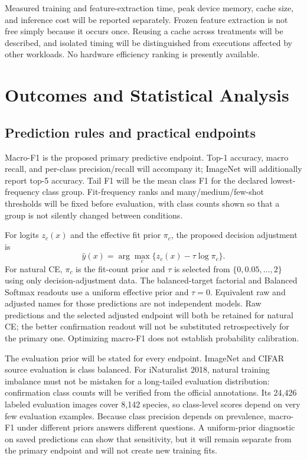 \documentclass[conference]{IEEEtran}
\begin{document}
Measured training and feature-extraction time, peak device memory, cache size, and inference cost will be reported separately. Frozen feature extraction is not free simply because it occurs once. Reusing a cache across treatments will be described, and isolated timing will be distinguished from executions affected by other workloads. No hardware efficiency ranking is presently available.

\section{Outcomes and Statistical Analysis}
\subsection{Prediction rules and practical endpoints}
Macro-F1 is the proposed primary predictive endpoint. Top-1 accuracy, macro recall, and per-class precision/recall will accompany it; ImageNet will additionally report top-5 accuracy. Tail F1 will be the mean class F1 for the declared lowest-frequency class group. Fit-frequency ranks and many/medium/few-shot thresholds will be fixed before evaluation, with class counts shown so that a group is not silently changed between conditions.

For logits $z_c(x)$ and the effective fit prior $\pi_c$, the proposed decision adjustment is
\begin{equation}
\hat y(x)=\arg\max_c\{z_c(x)-\tau\log\pi_c\}.
\label{eq:adjustment}
\end{equation}
For natural CE, $\pi_c$ is the fit-count prior and $\tau$ is selected from $\{0,0.05,\ldots,2\}$ using only decision-adjustment data. The balanced-target factorial and Balanced Softmax readouts use a uniform effective prior and $\tau=0$. Equivalent raw and adjusted names for those predictions are not independent models. Raw predictions and the selected adjusted endpoint will both be retained for natural CE; the better confirmation readout will not be substituted retrospectively for the primary one. Optimizing macro-F1 does not establish probability calibration.

The evaluation prior will be stated for every endpoint. ImageNet and CIFAR source evaluation is class balanced. For iNaturalist 2018, natural training imbalance must not be mistaken for a long-tailed evaluation distribution: confirmation class counts will be verified from the official annotations. Its 24,426 labeled evaluation images cover 8,142 species, so class-level scores depend on very few evaluation examples. Because class precision depends on prevalence, macro-F1 under different priors answers different questions. A uniform-prior diagnostic on saved predictions can show that sensitivity, but it will remain separate from the primary endpoint and will not create new training fits.
\end{document}
